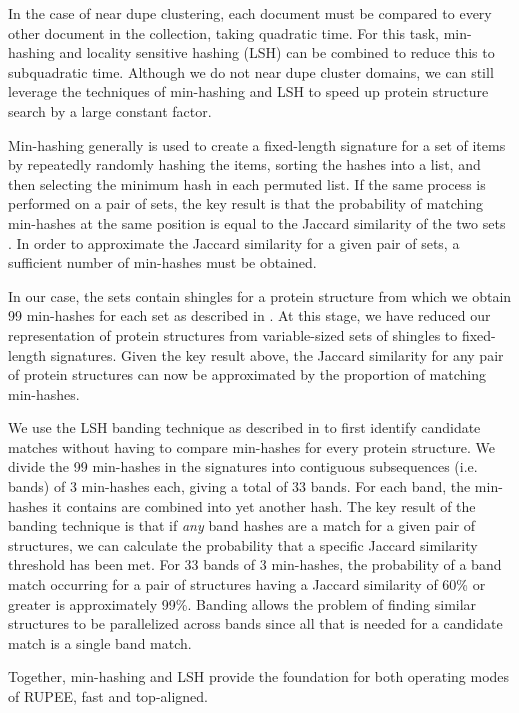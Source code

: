 \documentclass[10pt,letterpaper]{article}
\begin{document}
In the case of near dupe clustering, each document must be compared to every other document in the collection, taking quadratic time.
For this task, min-hashing \cite{Broder1998} and locality sensitive hashing (LSH) \cite{Indyk1998} can be combined to reduce this to subquadratic time. 
Although we do not near dupe cluster domains, we can still leverage the techniques of min-hashing and LSH to speed up protein structure search by a large constant factor.

Min-hashing generally is used to create a fixed-length signature for a set of items by repeatedly randomly hashing the items, sorting the hashes into a list, and then selecting the minimum hash in each permuted list.
If the same process is performed on a pair of sets, the key result is that the probability of matching min-hashes at the same position is equal to the Jaccard similarity of the two sets \cite{Broder1998}.
In order to approximate the Jaccard similarity for a given pair of sets, a sufficient number of min-hashes must be obtained. 

In our case, the sets contain shingles for a protein structure from which we obtain 99 min-hashes for each set as described in \cite{Rajaraman2012}. 
At this stage, we have reduced our representation of protein structures from variable-sized sets of shingles to fixed-length signatures.
Given the key result above, the Jaccard similarity for any pair of protein structures can now be approximated by the proportion of matching min-hashes. 

We use the LSH banding technique as described in \cite{Rajaraman2012} to first identify candidate matches without having to compare min-hashes for every protein structure. 
We divide the 99 min-hashes in the signatures into contiguous subsequences (i.e. bands) of 3 min-hashes each, giving a total of 33 bands. 
For each band, the min-hashes it contains are combined into yet another hash. 
The key result of the banding technique is that if \emph{any} band hashes are a match for a given pair of structures, we can calculate the probability that a specific Jaccard similarity threshold has been met.
For 33 bands of 3 min-hashes, the probability of a band match occurring for a pair of structures having a Jaccard similarity of 60\% or greater is approximately 99\%. 
Banding allows the problem of finding similar structures to be parallelized across bands since all that is needed for a candidate match is a single band match. 

Together, min-hashing and LSH provide the foundation for both operating modes of RUPEE, fast and top-aligned.
\end{document}
